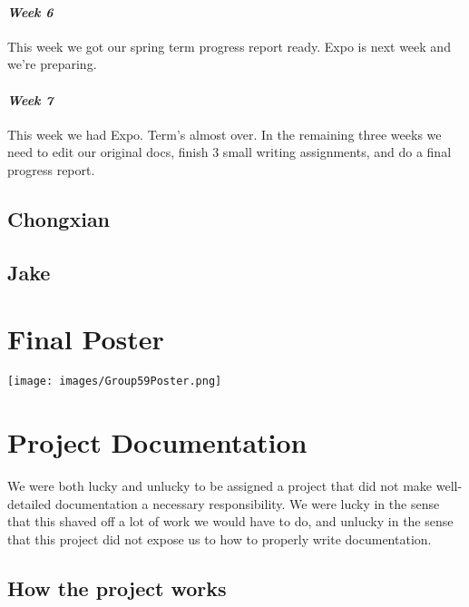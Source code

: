 \documentclass[onecolumn, draftclsnofoot,10pt, compsoc]{IEEEtran}
\begin{document}
\paragraph{\emph{Week 6}}
This week we got our spring term progress report ready. Expo is next week and we're preparing.
\paragraph{\emph{Week 7}}
This week we had Expo. Term's almost over. In the remaining three weeks we need to edit our original docs, finish 3 small writing assignments, and do a final progress report.
\subsection{Chongxian}

\subsection{Jake}

\newpage
\section{Final Poster}
\texttt{[image: images/Group59Poster.png]}
\newpage

\section{Project Documentation}
We were both lucky and unlucky to be assigned a project that did not make well-detailed documentation a necessary responsibility. We were lucky in the sense that this shaved off a lot of work we would have to do, and unlucky in the sense that this project did not expose us to how to properly write documentation.
\subsection{How the project works}
\end{document}

